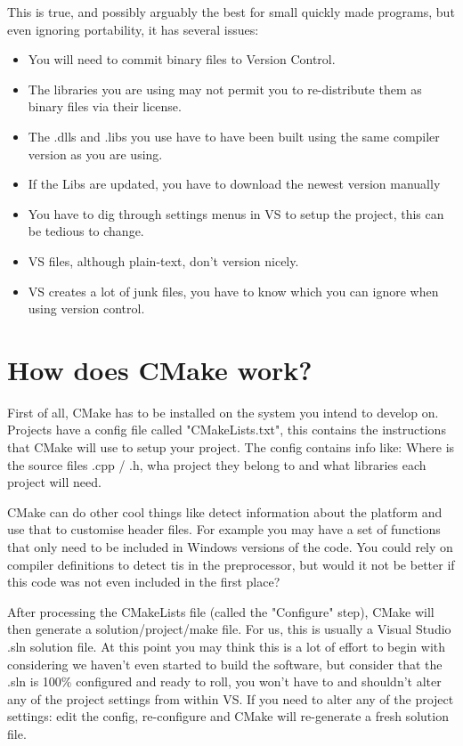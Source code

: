 \documentclass[11pt, a4paper]{article}
\begin{document}
    This is true, and possibly arguably the best for small quickly made programs, but even ignoring portability, it has several issues:
    \begin{itemize}
    	\item You will need to commit binary files to Version Control.
    	\item The libraries you are using may not permit you to re-distribute them as binary files via their license.
    	\item The .dlls and .libs you use have to have been built using the same compiler version as you are using.
    	\item If the Libs are updated, you have to download the newest version manually
    	\item You have to dig through settings menus in VS to setup the project, this can be tedious to change.
    	\item VS files, although plain-text, don't version nicely.
    	\item VS creates a lot of junk files, you have to know which you can ignore when using version control.
    \end{itemize}
	\clearpage
	
	\section{How does CMake work?}
	First of all, CMake has to be installed on the system you intend to develop on. Projects have a config file called "CMakeLists.txt", this contains the instructions that CMake will use to setup your project. The config contains info like: Where is the source files .cpp / .h, wha project they belong to and what libraries each project will need.
	
	CMake can do other cool things like detect information about the platform and use that to customise header files. For example you may have a set of functions that only need to be included in Windows versions of the code. You could rely on compiler definitions to detect tis in the preprocessor, but would it not be better if this code was not even included in the first place?
	
	After processing the CMakeLists file (called the "Configure" step), CMake will then generate a solution/project/make file. For us, this is usually a Visual Studio .sln solution file. At this point you may think this is a lot of effort to begin with considering we haven't even started to build the software, but consider that the .sln is 100\% configured and ready to roll, you won't have to and shouldn't alter any of the project settings from within VS. If you need to alter any of the project settings: edit the config, re-configure and CMake will re-generate a fresh solution file.
	
\end{document}
